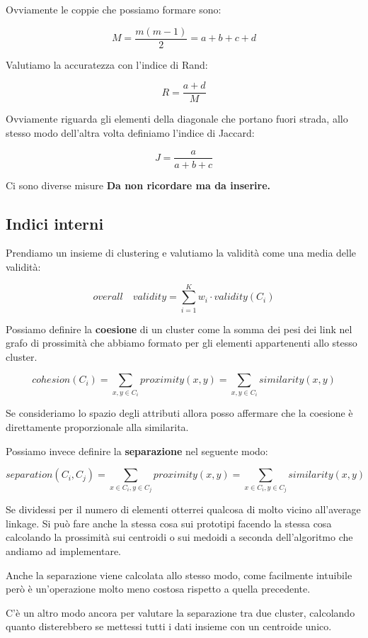 \documentclass[12pt, a4paper,titlepage,openany]{article}
\begin{document}
Ovviamente le coppie che possiamo formare sono:

\[M =  \frac{m(m-1)}{2} =  a+b+c+d\]

Valutiamo la accuratezza con l'indice di Rand:

\[R = \frac{a + d}{M}\]

Ovviamente riguarda gli elementi della diagonale che portano fuori strada, allo stesso modo dell'altra volta definiamo l'indice di Jaccard:

\[ J = \frac{a}{a+b+c}\]

Ci sono diverse misure \textbf{Da non ricordare ma da inserire.}

\subsection{Indici interni}

Prendiamo un insieme di clustering e valutiamo la validità come una media delle validità:

\[ overall \quad validity = \sum_{i = 1}^{K}w_{i} \cdot validity(C_{i})\]

Possiamo definire la \textbf{coesione} di un cluster come la somma dei pesi dei link nel grafo di prossimità che abbiamo formato per gli elementi appartenenti allo stesso cluster.

\[cohesion(C_{i}) = \sum_{x,y \in C_{i}}proximity(x,y) = \sum_{x,y \in C_{i} }similarity(x,y)   \]

Se consideriamo lo spazio degli attributi allora posso affermare che la coesione è direttamente proporzionale alla similarita.

Possiamo invece definire la \textbf{separazione} nel seguente modo:

\[separation(C_{i}, C_{j}) = \sum_{x \in C_{i},y\in C_{j} }proximity(x,y) = \sum_{x \in C_{i},y\in C_{j} }similarity(x,y)   \]

Se dividessi per il numero di elementi otterrei qualcosa di molto vicino all'average linkage.
Si può fare anche la stessa cosa sui prototipi facendo la stessa cosa calcolando la prossimità sui centroidi o sui medoidi a seconda dell'algoritmo che andiamo ad implementare.

Anche la separazione viene calcolata allo stesso modo, come facilmente intuibile però è un'operazione molto meno costosa rispetto a quella precedente.

C'è un altro modo ancora per valutare la separazione tra due cluster, calcolando quanto disterebbero se mettessi tutti i dati insieme con un centroide unico.
\end{document}
